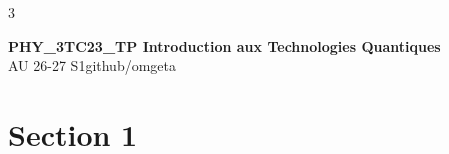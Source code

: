 \documentclass[12pt, a4paper]{article}
\newcommand{\mytitle}{PHY\_3TC23\_TP Introduction aux Technologies Quantiques}
\newcommand{\myauthor}{github/omgeta}
\newcommand{\mydate}{AU 26-27 S1}
\begin{document}
\raggedright
\footnotesize
\begin{multicols*}{3}
\setlength{\premulticols}{1pt}
\setlength{\postmulticols}{1pt}
\setlength{\multicolsep}{1pt}
\setlength{\columnsep}{2pt}

{\normalsize{\textbf{\mytitle}}}\\
{\footnotesize{\mydate\hspace{2pt}\textemdash\hspace{2pt}\myauthor}}
\section{Section 1}
\end{multicols*}
\end{document}
